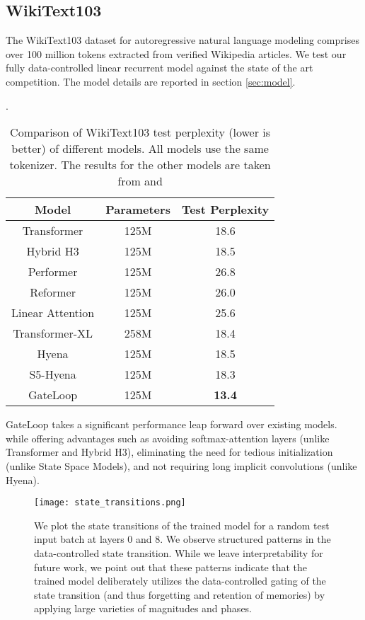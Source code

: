 \documentclass{article} \usepackage{iclr2024_conference,times}
\begin{document}
\subsection{WikiText103}\label{subsec:WikiText103}

The WikiText103 dataset for autoregressive natural language modeling comprises over 100 million tokens extracted from verified Wikipedia articles. We test our fully data-controlled linear recurrent model against the state of the art competition. The model details are reported in section \ref{sec:model}. 

\begin{table}[H]
    \caption{Comparison of WikiText103 test perplexity (lower is better) of different models. All models use the same tokenizer. The results for the other models are taken from \cite{poli2023hyena} and \cite{smith2023github}}.
    \centering
    \begin{tabular}{ccc}
        \toprule
        Model & Parameters & Test Perplexity \\ 
        \midrule
        Transformer & 125M & 18.6 \\ 
        Hybrid H3 & 125M & 18.5 \\ 
        Performer & 125M & 26.8 \\ 
        Reformer & 125M & 26.0 \\ 
        Linear Attention & 125M & 25.6 \\ 
        Transformer-XL & 258M & 18.4 \\ 
        Hyena & 125M & 18.5 \\
        S5-Hyena & 125M & 18.3 \\
        GateLoop & 125M & \textbf{13.4} \\
        \bottomrule
    \end{tabular}
    \label{table:2}
\end{table}

GateLoop takes a significant performance leap forward over existing models.  while offering advantages such as avoiding softmax-attention layers (unlike Transformer and Hybrid H3), eliminating the need for tedious initialization (unlike State Space Models), and not requiring long implicit convolutions (unlike Hyena). 

\begin{figure}[H]
    \begin{center}
        \texttt{[image: state\_transitions.png]}
    \end{center}
    \caption{We plot the state transitions of the trained model for a random test input batch at layers 0 and 8. We observe structured patterns in the data-controlled state transition. While we leave interpretability for future work, we point out that these patterns indicate that the trained model deliberately utilizes the data-controlled gating of the state transition (and thus forgetting and retention of memories) by applying large varieties of magnitudes and phases.}
\end{figure}
\end{document}
